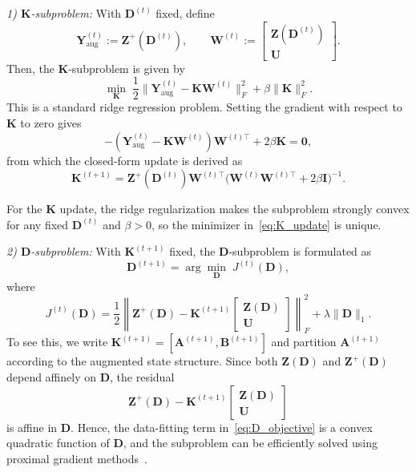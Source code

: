 \documentclass[final,3p,twocolumn,times]{elsarticle}
\newcommand{\Kmat}{\mathbf{K}}
\newcommand{\Dmat}{\mathbf{D}}
\newcommand{\A}{\mathbf{A}}
\newcommand{\B}{\mathbf{B}}
\newcommand{\I}{\mathbf{I}}
\newcommand{\Zmat}{\mathbf{Z}}
\newcommand{\Umat}{\mathbf{U}}
\newcommand{\W}{\mathbf{W}}
\begin{document}
\textit{1) $\Kmat$-subproblem:}
With $\Dmat^{(t)}$ fixed, define
\[
\mathbf{Y}_{\mathrm{aug}}^{(t)} := \Zmat^+(\Dmat^{(t)}), \qquad
\W^{(t)} :=
\begin{bmatrix}
\Zmat(\Dmat^{(t)}) \\ \Umat
\end{bmatrix}.
\]
Then, the $\Kmat$-subproblem is given by
\[
\min_{\Kmat} \; 
\frac{1}{2}\|\mathbf{Y}_{\mathrm{aug}}^{(t)}
- \Kmat \W^{(t)}\|_F^2
+ \beta\|\Kmat\|_F^2 .
\]
This is a standard ridge regression problem. Setting the gradient with respect to $\Kmat$ to zero gives
\[
-(\mathbf{Y}_{\mathrm{aug}}^{(t)} - \Kmat \W^{(t)})
\W^{(t)\top} + 2\beta\Kmat = \mathbf{0},
\]
from which the closed-form update is derived as
\begin{equation}
\label{eq:K_update}
\Kmat^{(t+1)}
= \Zmat^+(\Dmat^{(t)}) \W^{(t)\top}
\bigl( \W^{(t)} \W^{(t)\top} + 2\beta \I \bigr)^{-1}.
\end{equation}

For the $\Kmat$ update, the ridge regularization makes the subproblem strongly convex for any fixed $\Dmat^{(t)}$ and $\beta>0$, so the minimizer in~\eqref{eq:K_update} is unique.

\textit{2) $\Dmat$-subproblem:} With $\Kmat^{(t+1)}$ fixed, the $\Dmat$-subproblem is formulated as
\begin{equation}
\label{eq:D_subproblem}
\Dmat^{(t+1)} = \arg\min_{\Dmat} \; J^{(t)}(\Dmat),
\end{equation}
where
\begin{equation}
\label{eq:D_objective}
J^{(t)}(\Dmat) = \frac{1}{2}\left\| \Zmat^+(\Dmat) - \Kmat^{(t+1)}
\begin{bmatrix}
\Zmat(\Dmat) \\ \Umat
\end{bmatrix} \right\|_F^2
+ \lambda\|\Dmat\|_1.
\end{equation}
To see this, we write $\Kmat^{(t+1)} = [\A^{(t+1)},\B^{(t+1)}]$ and partition $\A^{(t+1)}$ according to the augmented state structure. Since both $\Zmat(\Dmat)$ and $\Zmat^+(\Dmat)$ depend affinely on $\Dmat$, the residual
\[
\Zmat^+(\Dmat) - \Kmat^{(t+1)}
\begin{bmatrix}
\Zmat(\Dmat) \\ \Umat
\end{bmatrix}
\]
is affine in $\Dmat$. Hence, the data-fitting term in~\eqref{eq:D_objective} is a convex quadratic function of $\Dmat$, and the subproblem can be efficiently solved using proximal gradient methods~\cite{Beck2009ISTA}.
\end{document}
